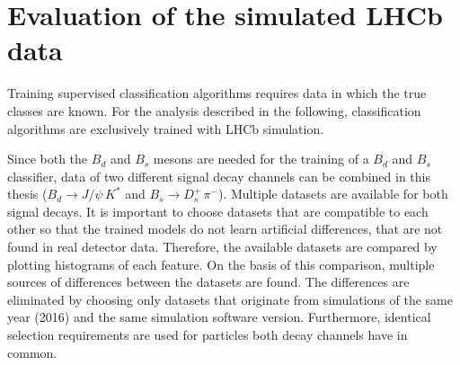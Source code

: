 \section{Evaluation of the simulated LHCb data}

Training supervised classification algorithms requires data in which the true classes are known.
For the analysis described in the following, classification algorithms are exclusively trained with LHCb simulation.

Since both the $B_d$ and $B_s$ mesons are needed for the training of a $B_d$ and $B_s$ classifier, data of two different signal decay channels can be combined in this thesis ($B_d \rightarrow J/\psi \, K^*$ and $B_s \rightarrow D^+_s \, \pi^-$). 
Multiple datasets are available for both signal decays.
It is important to choose datasets that are compatible to each other so that the trained models do not learn artificial differences, that are not found in real detector data.
Therefore, the available datasets are compared by plotting histograms of each feature.
On the basis of this comparison, multiple sources of differences between the datasets are found.
The differences are eliminated by choosing only datasets that originate from simulations of the same year (2016) and the same simulation software version. 
Furthermore, identical selection requirements are used for particles both decay channels have in common.




